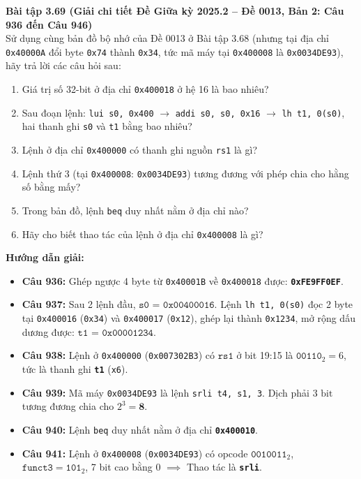 \textbf{Bài tập 3.69 (Giải chi tiết Đề Giữa kỳ 2025.2 -- Đề 0013, Bản 2: Câu 936 đến Câu 946)}\\
Sử dụng cùng bản đồ bộ nhớ của Đề 0013 ở Bài tập 3.68 (nhưng tại địa chỉ \texttt{0x40000A} đổi byte \texttt{0x74} thành \texttt{0x34}, tức mã máy tại \texttt{0x400008} là \texttt{0x0034DE93}), hãy trả lời các câu hỏi sau:
\begin{enumerate}[label=\textbf{Câu \arabic*.}, start=936]
    \item Giá trị số 32-bit ở địa chỉ \texttt{0x400018} ở hệ 16 là bao nhiêu?
    \item Sau đoạn lệnh: \texttt{lui s0, 0x400} $\rightarrow$ \texttt{addi s0, s0, 0x16} $\rightarrow$ \texttt{lh t1, 0(s0)}, hai thanh ghi \texttt{s0} và \texttt{t1} bằng bao nhiêu?
    \item Lệnh ở địa chỉ \texttt{0x400000} có thanh ghi nguồn \texttt{rs1} là gì?
    \item Lệnh thứ 3 (tại \texttt{0x400008}: \texttt{0x0034DE93}) tương đương với phép chia cho hằng số bằng mấy?
    \item Trong bản đồ, lệnh \texttt{beq} duy nhất nằm ở địa chỉ nào?
    \item Hãy cho biết thao tác của lệnh ở địa chỉ \texttt{0x400008} là gì?
\end{enumerate}
\textbf{Hướng dẫn giải:}
\begin{itemize}
    \item \textbf{Câu 936:} Ghép ngược 4 byte từ \texttt{0x40001B} về \texttt{0x400018} được: \textbf{\texttt{0xFE9FF0EF}}.
    \item \textbf{Câu 937:} Sau 2 lệnh đầu, $\mathbf{\texttt{s0 = 0x00400016}}$. Lệnh \texttt{lh t1, 0(s0)} đọc 2 byte tại \texttt{0x400016} (\texttt{0x34}) và \texttt{0x400017} (\texttt{0x12}), ghép lại thành \texttt{0x1234}, mở rộng dấu dương được: $\mathbf{\texttt{t1 = 0x00001234}}$.
    \item \textbf{Câu 938:} Lệnh ở \texttt{0x400000} (\texttt{0x007302B3}) có $\texttt{rs1}$ ở bit 19:15 là $\texttt{00110}_2 = 6$, tức là thanh ghi \textbf{\texttt{t1}} (\texttt{x6}).
    \item \textbf{Câu 939:} Mã máy \texttt{0x0034DE93} là lệnh \texttt{srli t4, s1, 3}. Dịch phải $3\text{ bit}$ tương đương chia cho $2^3 = \mathbf{8}$.
    \item \textbf{Câu 940:} Lệnh \texttt{beq} duy nhất nằm ở địa chỉ \textbf{\texttt{0x400010}}.
    \item \textbf{Câu 941:} Lệnh ở \texttt{0x400008} (\texttt{0x0034DE93}) có opcode $\texttt{0010011}_2$, $\texttt{funct3} = \texttt{101}_2$, 7 bit cao bằng $0$ $\implies$ Thao tác là \textbf{\texttt{srli}}.
\end{itemize}

